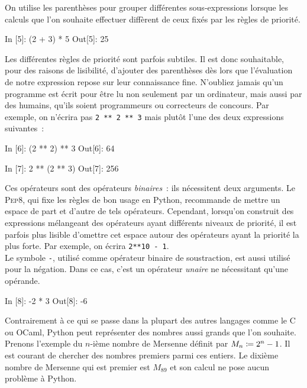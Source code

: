 \documentclass{magnoliaold}
\begin{document}
\noindent
On utilise les parenthèses pour grouper différentes sous-expressions lorsque les calculs
que l'on souhaite effectuer diffèrent de ceux fixés par les règles de priorité.

\begin{pythoncode}
In [5]: (2 + 3) * 5
Out[5]: 25 
\end{pythoncode}

\noindent
Les différentes règles de priorité sont parfois subtiles. Il est donc souhaitable, pour des raisons de lisibilité,
d'ajouter des parenthèses dès lors que l'évaluation de notre expression repose sur leur
connaissance fine. N'oubliez jamais qu'un programme est écrit pour être lu non seulement par
un ordinateur, mais aussi par des humains, qu'ils soient programmeurs ou correcteurs de
concours. Par exemple, on n'écrira pas \verb_2 ** 2 ** 3_ mais plutôt l'une
des deux expressions suivantes~:

\begin{pythoncode}
In [6]: (2 ** 2) ** 3
Out[6]: 64

In [7]: 2 ** (2 ** 3)
Out[7]: 256
\end{pythoncode}

\noindent 
Ces opérateurs sont des opérateurs \emph{binaires}~: ils nécessitent deux arguments.
Le \textsc{Pep8}, qui fixe les règles de bon usage
en Python, recommande de mettre un espace de part et d'autre de tels opérateurs.
Cependant, lorsqu'on construit des expressions mélangeant des opérateurs ayant
différents niveaux de priorité, il est parfois plus lisible d'omettre cet espace autour des
opérateurs ayant la priorité la plus forte. Par exemple, on écrira \verb!2**10 - 1!.\\

Le symbole \og\verb_-_\fg, utilisé comme opérateur
binaire de soustraction, est aussi utilisé pour la négation. Dans ce cas, c'est
un opérateur \emph{unaire} ne nécessitant qu'une opérande.

\begin{pythoncode}
In [8]: -2 * 3
Out[8]: -6
\end{pythoncode}
\noindent
Contrairement à ce qui se passe dans la plupart des autres langages comme le \textsc{C} ou
OCaml, Python peut représenter des nombres aussi grands que l'on souhaite.
Prenons l'exemple du $n$-ième nombre de Mersenne définit par
$M_n\coloneqq 2^n-1$. Il est courant de chercher des nombres premiers parmi ces entiers. Le
dixième nombre de Mersenne qui est premier est $M_{89}$ et son calcul ne pose aucun
problème à Python.
\end{document}
